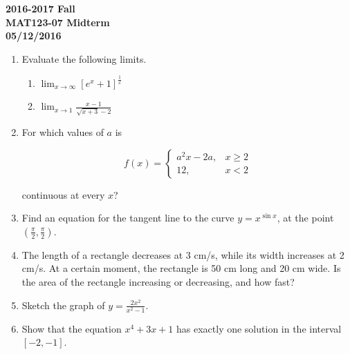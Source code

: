 \documentclass[a4paper, 12pt]{article}
\renewcommand{\headrulewidth}{0pt}
\begin{document}
\pagestyle{empty}

\begin{center}
\textbf{2016-2017 Fall \\MAT123-07 Midterm\\05/12/2016}
\end{center}

\begin{enumerate}[leftmargin=*,label=\textbf{\arabic*.}]

\item Evaluate the following limits.

\begin{enumerate}[leftmargin=*,label=\textbf{\alph*.}]

\item $\displaystyle \lim_{x \to \infty} [ e^x + 1]^{\frac{1}{x}}$

\item $\displaystyle \lim_{x \to 1} \frac{x-1}{\sqrt{x+3} - 2}$

\end{enumerate}

\item For which values of $a$ is

\[
f(x) =
\begin{cases}
a^2x - 2a, & x \geq 2 \\
12,  & x < 2
\end{cases}
\]

continuous at every $x$?

\item Find an equation for the tangent line to the curve $ y = x^{\sin x}$, at the point $(\frac{\pi}{2}, \frac{\pi}{2})$.

\item The length of a rectangle decreases at 3 cm/s, while its width increases at 2 cm/s. At a certain moment, the rectangle is 50 cm long and 20 cm wide. Is the area of the rectangle increasing or decreasing, and how fast?

\item Sketch the graph of $\displaystyle y = \frac{2x^2}{x^2-1}$.

\item Show that the equation $x^4 + 3x + 1$ has exactly one solution in the interval $[-2, -1]$.

\end{enumerate}

\newpage
\pagestyle{fancy}
\renewcommand{\headrulewidth}{1pt}
\end{document}

